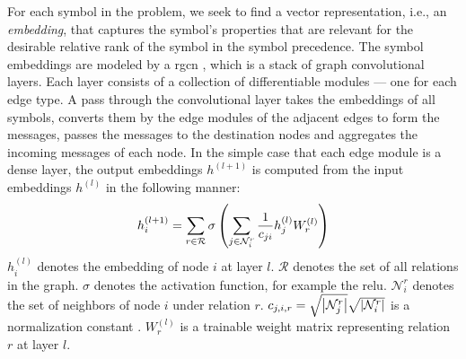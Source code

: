 For each symbol in the problem,
we seek to find a vector representation, i.e., an \emph{embedding},
that captures the symbol's properties that are relevant
for the desirable relative rank of the symbol in the symbol precedence.
The symbol embeddings are modeled by a \gls{rgcn} \cite{Schlichtkrull2017},
which is a stack of graph convolutional layers.
Each layer consists of a collection of differentiable modules --- one for each edge type.
A pass through the convolutional layer takes the embeddings of all symbols,
converts them by the edge modules of the adjacent edges to form the messages,
passes the messages to the destination nodes
and aggregates the incoming messages of each node.
In the simple case that each edge module is a dense layer,
the output embeddings $h^{(l+1)}$ is computed from the input embeddings $h^{(l)}$ in the following manner:
$$
h_i^{(l+1)} =
\sum_{r \in \mathcal{R}} \sigma \left(\sum_{j \in \mathcal{N}_i^r} \frac{1}{c_{ji}} h_j^{(l)} W_r^{(l)}\right)
$$
$h_i^{(l)}$ denotes the embedding of node $i$ at layer $l$.
$\mathcal{R}$ denotes the set of all relations in the graph.
$\sigma$ denotes the activation function, for example the \gls{relu}.
$\mathcal{N}_i^r$ denotes the set of neighbors of node $i$ under relation $r$.
$c_{j, i, r} = \sqrt{\left|\mathcal{N}_j^r\right|} \sqrt{\left|\mathcal{N}_i^r\right|}$ is a normalization constant \cite{kipf2017semisupervised}.
$W_r^{(l)}$ is a trainable weight matrix representing relation $r$ at layer $l$.




